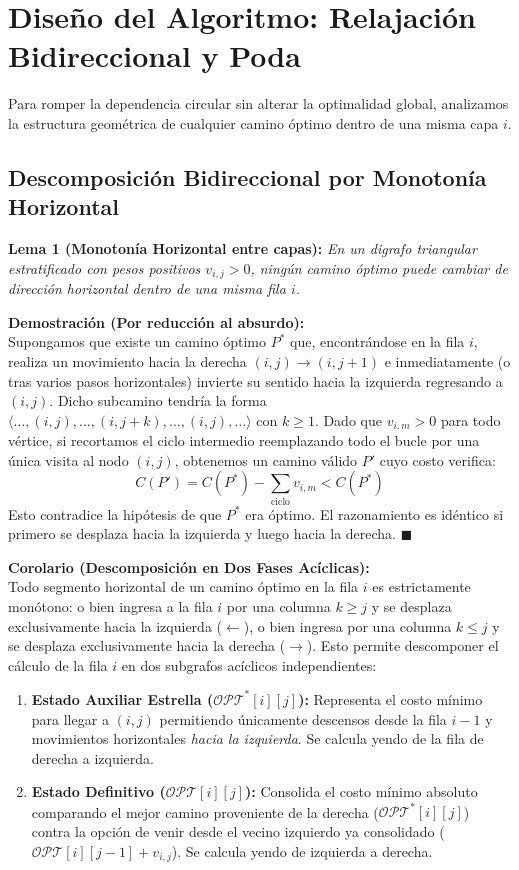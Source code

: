 \section{Diseño del Algoritmo: Relajación Bidireccional y Poda}

Para romper la dependencia circular sin alterar la optimalidad global, analizamos la estructura geométrica de cualquier camino óptimo dentro de una misma capa $i$.

\subsection{Descomposición Bidireccional por Monotonía Horizontal}

\textbf{Lema 1 (Monotonía Horizontal entre capas):} \textit{En un digrafo triangular estratificado con pesos positivos $v_{i,j} > 0$, ningún camino óptimo puede cambiar de dirección horizontal dentro de una misma fila $i$.}

\textbf{Demostración (Por reducción al absurdo):} \\
Supongamos que existe un camino óptimo $P^*$ que, encontrándose en la fila $i$, realiza un movimiento hacia la derecha $(i, j) \to (i, j+1)$ e inmediatamente (o tras varios pasos horizontales) invierte su sentido hacia la izquierda regresando a $(i, j)$. Dicho subcamino tendría la forma $\langle \dots, (i, j), \dots, (i, j+k), \dots, (i, j), \dots \rangle$ con $k \geq 1$. Dado que $v_{i,m} > 0$ para todo vértice, si recortamos el ciclo intermedio reemplazando todo el bucle por una única visita al nodo $(i, j)$, obtenemos un camino válido $P'$ cuyo costo verifica:
\[
    C(P') = C(P^*) - \sum_{\text{ciclo}} v_{i,m} < C(P^*)
\]
Esto contradice la hipótesis de que $P^*$ era óptimo. El razonamiento es idéntico si primero se desplaza hacia la izquierda y luego hacia la derecha. $\blacksquare$

\vspace{1ex}
\noindent\textbf{Corolario (Descomposición en Dos Fases Acíclicas):} \\
Todo segmento horizontal de un camino óptimo en la fila $i$ es estrictamente monótono: o bien ingresa a la fila $i$ por una columna $k \geq j$ y se desplaza exclusivamente hacia la izquierda ($\leftarrow$), o bien ingresa por una columna $k \leq j$ y se desplaza exclusivamente hacia la derecha ($\rightarrow$). Esto permite descomponer el cálculo de la fila $i$ en dos subgrafos acíclicos independientes:
\begin{enumerate}
    \item \textbf{Estado Auxiliar Estrella ($\mathcal{OPT}^*[i][j]$):} Representa el costo mínimo para llegar a $(i,j)$ permitiendo únicamente descensos desde la fila $i-1$ y movimientos horizontales \textit{hacia la izquierda}. Se calcula yendo de la fila de derecha a izquierda.
    \item \textbf{Estado Definitivo ($\mathcal{OPT}[i][j]$):} Consolida el costo mínimo absoluto comparando el mejor camino proveniente de la derecha ($\mathcal{OPT}^*[i][j]$) contra la opción de venir desde el vecino izquierdo ya consolidado ($\mathcal{OPT}[i][j-1] + v_{i,j}$). Se calcula yendo de izquierda a derecha.
\end{enumerate}

